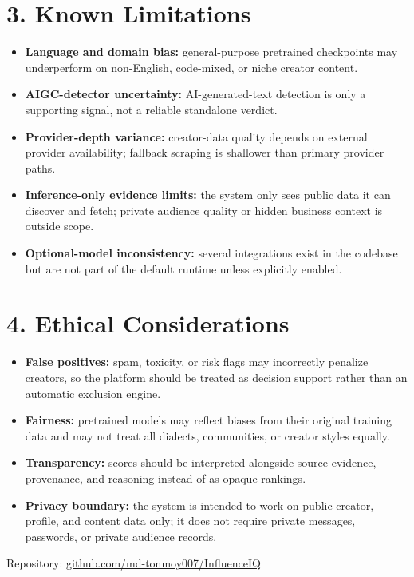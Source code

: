 \documentclass[10pt,a4paper]{article}
\begin{document}
\section{3. Known Limitations}
\begin{itemize}
\item \textbf{Language and domain bias:} general-purpose pretrained checkpoints may underperform on non-English, code-mixed, or niche creator content.
\item \textbf{AIGC-detector uncertainty:} AI-generated-text detection is only a supporting signal, not a reliable standalone verdict.
\item \textbf{Provider-depth variance:} creator-data quality depends on external provider availability; fallback scraping is shallower than primary provider paths.
\item \textbf{Inference-only evidence limits:} the system only sees public data it can discover and fetch; private audience quality or hidden business context is outside scope.
\item \textbf{Optional-model inconsistency:} several integrations exist in the codebase but are not part of the default runtime unless explicitly enabled.
\end{itemize}

\section{4. Ethical Considerations}
\begin{itemize}
\item \textbf{False positives:} spam, toxicity, or risk flags may incorrectly penalize creators, so the platform should be treated as decision support rather than an automatic exclusion engine.
\item \textbf{Fairness:} pretrained models may reflect biases from their original training data and may not treat all dialects, communities, or creator styles equally.
\item \textbf{Transparency:} scores should be interpreted alongside source evidence, provenance, and reasoning instead of as opaque rankings.
\item \textbf{Privacy boundary:} the system is intended to work on public creator, profile, and content data only; it does not require private messages, passwords, or private audience records.
\end{itemize}

\smallskip
\footnotesize Repository: \href{https://github.com/md-tonmoy007/InfluenceIQ}{github.com/md-tonmoy007/InfluenceIQ}
\end{document}
